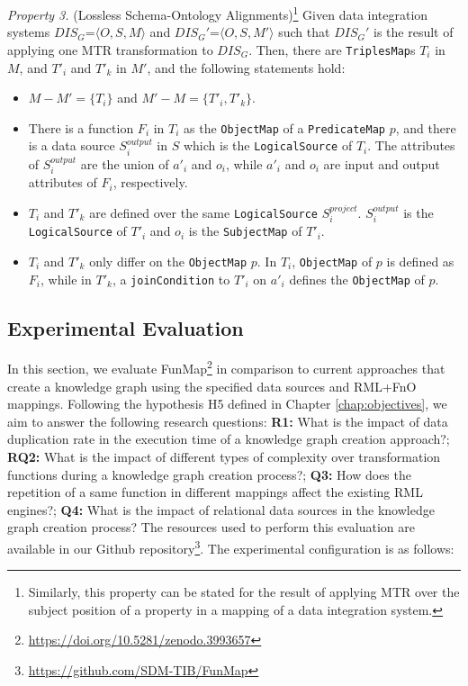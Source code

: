 \noindent\textit{Property 3.} (Lossless Schema-Ontology Alignments)\footnote{Similarly, this property can be stated for the result of applying MTR over the subject position of a property in a mapping of a data integration system.}
\label{property:p3}
Given data integration systems $DIS_G$=$\langle O,S,M\rangle$ and  $DIS_G'$=$\langle O,S,M'\rangle$ such that $DIS_G'$ is the result of applying one MTR transformation to $DIS_G$. Then, there are \verb|TriplesMap|s $T_i$ in $M$, 
and  $T'_i$ and $T'_k$ in $M'$, and the following statements hold:
\begin{itemize}
    \item $M - M'=\{T_i\}$ and $M'- M=\{T'_i,T'_k\}$. 
    \item There is a function $F_i$ in $T_i$ as the \verb|ObjectMap| of a  \verb|PredicateMap| $p$, and there is a data source $S_i^{output}$ in $S$ which is the \verb|LogicalSource| of $T_i$. The attributes of $S_i^{output}$ are the union of $a'_i$ and $o_i$, while $a'_i$ and $o_i$ are input and output attributes of $F_i$, respectively.
    \item $T_i$ and $T'_k$ are defined over the same \verb|LogicalSource|  $S_i^{project}$. $S_i^{output}$ is the \verb|LogicalSource| of $T'_i$ and $o_i$ is the \verb|SubjectMap| of $T'_i$.  
    \item $T_i$ and $T'_k$ only differ on the \verb|ObjectMap| $p$. In $T_i$, \verb|ObjectMap| of $p$ is defined as $F_i$, while in $T'_k$, a \verb|joinCondition| to $T'_i$ on $a'_i$ defines the \verb|ObjectMap| of $p$. 
\end{itemize}


\subsection{Experimental Evaluation}

In this section, we evaluate FunMap\footnote{\url{https://doi.org/10.5281/zenodo.3993657}} in comparison to current approaches that create a knowledge graph using the specified data sources and RML+FnO mappings. Following the hypothesis H5 defined in Chapter \ref{chap:objectives}, we aim to answer the following research questions: 
\textbf{R1:} What is the impact of data duplication rate in the execution time of a knowledge graph creation approach?; \textbf{RQ2:} What is the impact of different types of complexity over transformation functions during a knowledge graph creation process?; \textbf{Q3:} How does the repetition of a same function in different mappings affect the existing RML engines?; \textbf{Q4:} What is the impact of relational data sources in the knowledge graph creation process?
The resources used to perform this evaluation are available in our Github repository\footnote{\url{https://github.com/SDM-TIB/FunMap}}. The experimental configuration is as follows:

